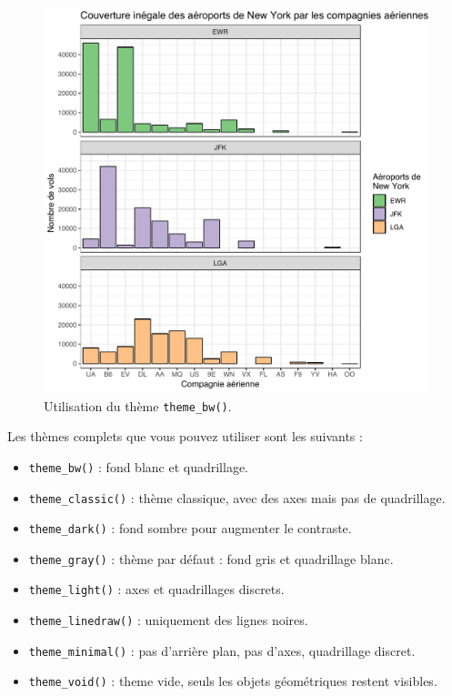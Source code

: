 \documentclass[
  a4paper,
]{article}
\providecommand{\tightlist}{%
  \setlength{\itemsep}{0pt}\setlength{\parskip}{0pt}}
\begin{document}
\begin{figure}[htpb]

{\centering \includegraphics[width=0.9\linewidth]{figure/themebw-1} 

}

\caption{Utilisation du thème \texttt{theme\_bw()}.}\label{fig:themebw}
\end{figure}



Les thèmes complets que vous pouvez utiliser sont les suivants :

\begin{itemize}
\tightlist
\item
  \texttt{theme\_bw()} : fond blanc et quadrillage.
\item
  \texttt{theme\_classic()} : thème classique, avec des axes mais pas de quadrillage.
\item
  \texttt{theme\_dark()} : fond sombre pour augmenter le contraste.
\item
  \texttt{theme\_gray()} : thème par défaut : fond gris et quadrillage blanc.
\item
  \texttt{theme\_light()} : axes et quadrillages discrets.
\item
  \texttt{theme\_linedraw()} : uniquement des lignes noires.
\item
  \texttt{theme\_minimal()} : pas d'arrière plan, pas d'axes, quadrillage discret.
\item
  \texttt{theme\_void()} : theme vide, seuls les objets géométriques restent visibles.
\end{itemize}
\end{document}
